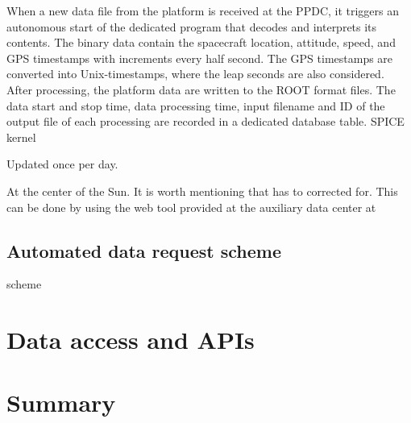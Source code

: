 \documentclass{aa}
\begin{document}
When a new data file from the platform is received at the PPDC,
it triggers an autonomous start of the dedicated program that decodes and
interprets its contents. The binary data contain the spacecraft location, attitude, speed, and GPS timestamps with increments every half second. The GPS timestamps are converted into Unix-timestamps, where the leap seconds are also considered. After processing, the platform data are written to the ROOT format files. The data start and stop time, data processing time, input filename and ID of the output file of each processing are recorded in a dedicated database table.
SPICE kernel

Updated once per day.

At the center of the Sun.
It is worth mentioning that has to corrected for.
This can be done by using the web tool provided at the auxiliary data center at

\subsection{Automated data request scheme}
scheme


\section{Data access and APIs}

\section{Summary}
\label{sec:summary}



%
%



\end{document}
